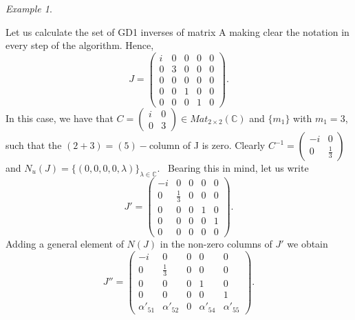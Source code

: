 \documentclass[10pt,a4paper]{amsart}
\theoremstyle{plain}
\theoremstyle{remark}
\newtheorem{exam}{Example}
\numberwithin{equation}{section} \numberwithin{defn}{section}
\begin{document}
\begin{exam}\label{Ex: Comp GD1}

 Let us calculate the set of GD1 inverses of matrix A making clear the notation in every step of the algorithm. Hence,
 $$J=\begin{pmatrix}
i & 0 & 0 & 0 & 0 \\
0 & 3 & 0 & 0 & 0 \\
0 & 0 & 0 & 0 & 0 \\
0 & 0 & 1 & 0 & 0 \\
0 & 0 & 0 & 1 & 0
\end{pmatrix}. $$\noindent In this case, we have that $C=\begin{pmatrix}
i & 0 \\
0 & 3
\end{pmatrix}\in Mat_{2 \times 2}(\mathbb{C})$ and $\{m_1\}$ with $m_{1}=3$, such that the $(2+3)=(5)-$column of J is zero. Clearly $C^{-1}=\begin{pmatrix}
-i & 0 \\
0 & \frac{1}{3}
\end{pmatrix}$ and $N_u(J)=\{ ( 0,0,0,0,\lambda ) \}_{\lambda \in \mathbb{C}}.$ \ Bearing this in mind, let us write $$J'=\begin{pmatrix}
-i & 0 & 0 & 0 & 0 \\
0 & \frac{1}{3} & 0 & 0 & 0 \\
0 & 0 & 0 & 1 & 0 \\
0 & 0 & 0 & 0 & 1 \\
0 & 0 & 0 & 0 & 0
\end{pmatrix}.$$ Adding a general element of $N(J)$ in the non-zero columns of $J'$ we obtain $$J''= \begin{pmatrix}
-i & 0 & 0 & 0 & 0 \\
0 & \frac{1}{3} & 0 & 0 & 0 \\
0 & 0 & 0 & 1 & 0 \\
0 & 0 & 0 & 0 & 1 \\
\alpha'_{51} & \alpha'_{52} & 0 & \alpha'_{54} & \alpha'_{55}
\end{pmatrix}.$$


\end{exam}
\end{document}
